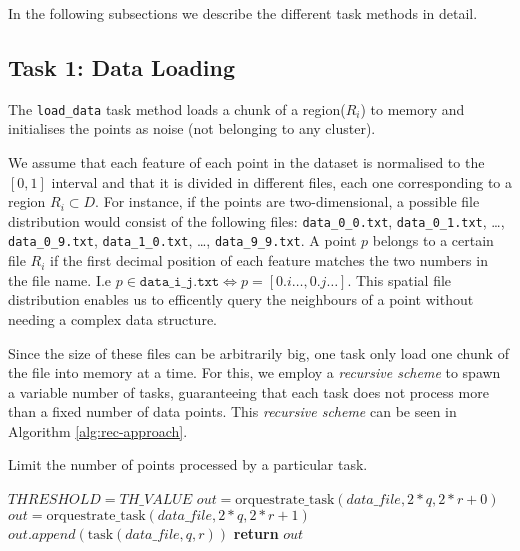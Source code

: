 \documentclass[10pt,journal,compsoc]{IEEEtran}
\let\MYoriglatexcaption\caption
\renewcommand{\caption}[2][\relax]{\MYoriglatexcaption[#2]{#2}}
\begin{document}
In the following subsections we describe the different task methods in detail.

\subsection{Task 1: Data Loading} \label{subsec:data-loading}

The \texttt{load\_data} task method loads a chunk of a region($R_i$) to memory and initialises the points as noise (not belonging to any cluster).

We assume that each feature of each point in the dataset is normalised to the $[0,1]$ interval and that it is divided in different files, each one corresponding to a region $R_i \subset D$. For instance, if the points are two-dimensional, a possible file distribution would consist of the following files: \texttt{data\_0\_0.txt}, \texttt{data\_0\_1.txt}, \dots, \texttt{data\_0\_9.txt}, \texttt{data\_1\_0.txt}, \dots, \texttt{data\_9\_9.txt}. A point $p$ belongs to a certain file $R_i$ if the first decimal position of each feature matches the two numbers in the file name. I.e $p \in \texttt{data\_i\_j.txt} \Leftrightarrow p = [0.i\dots, 0.j\dots]$. This spatial file distribution enables us to efficently query the neighbours of a point without needing a complex data structure.

Since the size of these files can be arbitrarily big, one task only load one chunk of the file into memory at a time. For this, we employ a \emph{recursive scheme} to spawn a variable number of tasks, guaranteeing that each task does not process more than a fixed number of data points. This \emph{recursive scheme} can be seen in Algorithm \ref{alg:rec-approach}.

\begin{algorithm}
  \caption{Limit the number of points processed by a particular task. \label{alg:rec-approach}}
  \begin{algorithmic}[1]
        \State $THRESHOLD = TH\_VALUE$
                \State $out = \text{orquestrate\_task}(data\_file, 2*q, 2*r + 0)$
                \State $out = \text{orquestrate\_task}(data\_file, 2*q, 2*r + 1)$
            \Else
                \State $out.append(\text{task}(data\_file, q, r))$
            \EndIf
        \State \textbf{return} $out$
    \EndFunction
  \end{algorithmic}
\end{algorithm}
\end{document}
